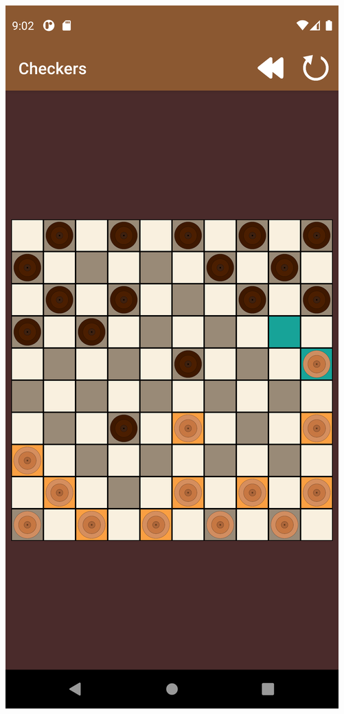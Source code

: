 \documentclass{beamer}
\begin{document}
\begin{frame}
\begin{center}
    \includegraphics[scale=0.05]{partie_2.png}
  \end{center}

\end{frame}
\end{document}

